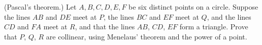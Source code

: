 (Pascal's theorem.) Let $A,B,C,D,E,F$ be six distinct points on a circle. Suppose the lines $AB$ and $DE$ meet at $P$, the lines $BC$ and $EF$ meet at $Q$, and the lines $CD$ and $FA$ meet at $R$, and that the lines $AB$, $CD$, $EF$ form a triangle. Prove that $P$, $Q$, $R$ are collinear, using Menelaus' theorem and the power of a point.
